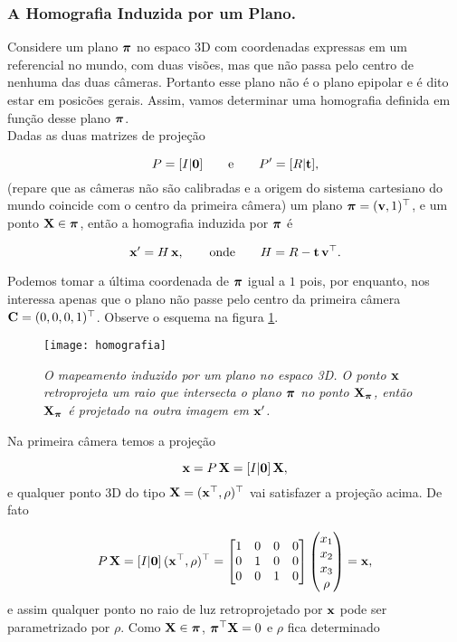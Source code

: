 \subsubsection{A Homografia Induzida por um Plano.}\label{sec.homografia}

Considere um plano $\boldsymbol{\pi}$ no espaco 3D com coordenadas expressas em um referencial no mundo, com duas visões, mas que não passa pelo centro de nenhuma das duas câmeras. Portanto esse plano não é o plano epipolar e é dito estar em posicões gerais. Assim, vamos determinar uma homografia definida em função desse plano $\boldsymbol{\pi}$.\\

Dadas as duas matrizes de projeção 

\begin{equation*}
P=[I|{\bf 0}]\qquad\text{e}\qquad P'=[R|{\bf t}],
\end{equation*}
(repare que as câmeras não são calibradas e a origem do sistema cartesiano do mundo coincide com o centro da primeira câmera) um plano $\boldsymbol{\pi}=({\bf v},1)^\top$, e um ponto $\mathbf{X}\in\boldsymbol{\pi}$, então a homografia induzida por $\boldsymbol{\pi}$ é

\begin{equation*}
\mathbf{x}'=H\,\mathbf{x},\qquad\text{onde}\qquad H=R-{\bf t}\,{\bf v}^\top.
\end{equation*}

Podemos tomar a última coordenada de $\boldsymbol{\pi}$ igual a $1$ pois, por enquanto, nos interessa apenas que o plano não passe pelo centro da primeira câmera ${\bf C}=(0,0,0,1)^\top$. Observe o esquema na figura \ref{fig.homografia}. 

\begin{figure}[!htb]
\centering
\texttt{[image: homografia]}
\caption{\textit{O mapeamento induzido por um plano no espaco 3D. O ponto $\mathbf{x}$ retroprojeta um raio que intersecta o plano $\boldsymbol{\pi}$ no ponto $\mathbf{X}_{\boldsymbol{\pi}}$, então $\mathbf{X}_{\boldsymbol{\pi}}$ é projetado na outra imagem em $\mathbf{x}'$.}}
\label{fig.homografia}
\end{figure}




Na primeira câmera temos a projeção

\begin{equation*}
\mathbf{x}=P\,\mathbf{X}=[I|{\bf 0}]\,\mathbf{X},
\end{equation*}
e qualquer ponto 3D do tipo $\mathbf{X}=(\mathbf{x}^\top,\rho)^\top$ vai satisfazer a projeção acima. De fato

\begin{equation*}
P\,\mathbf{X}=
[I|{\bf 0}]\,(\mathbf{x}^\top,\rho)^\top=
\begin{bmatrix}
1&0&0&0\\
0&1&0&0\\
0&0&1&0
\end{bmatrix}
\begin{pmatrix}
x_1\\
x_2\\
x_3\\
\rho
\end{pmatrix}
=\mathbf{x},
\end{equation*}
e assim qualquer ponto no raio de luz retroprojetado por $\mathbf{x}$ pode ser parametrizado por $\rho$. Como $\mathbf{X}\in\boldsymbol{\pi}$, $\boldsymbol{\pi}^\top\mathbf{X}=0$ e  
$\rho$ fica determinado

